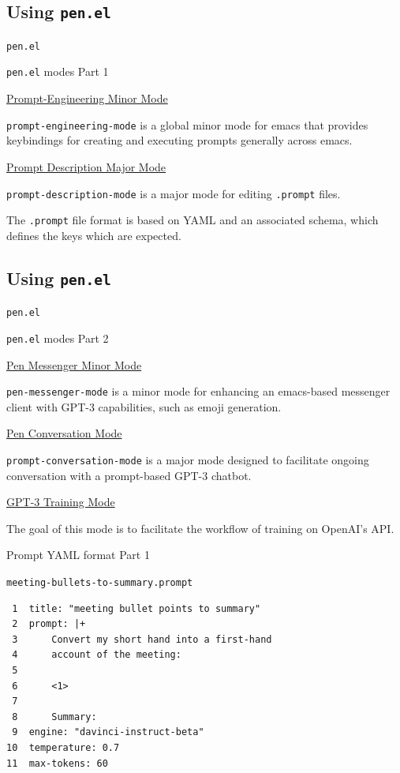 \documentclass[presentation]{beamer}
\begin{document}
\subsection{Using \texttt{pen.el}}
\label{sec:org3d01bf0}
\begin{frame}[label={sec:orga339e2e},fragile]{\texttt{pen.el}}
 \begin{block}{\texttt{pen.el} modes Part 1}
{\footnotesize
\uline{\alert{Prompt-Engineering Minor Mode}}

\texttt{prompt-engineering-mode} is a global minor
mode for emacs that provides keybindings for
creating and executing prompts generally
across emacs.

\uline{\alert{Prompt Description Major Mode}}

\texttt{prompt-description-mode} is a major mode for
editing \texttt{.prompt} files.

The \texttt{.prompt} file format is based on YAML and
an associated schema, which defines the keys
which are expected.
}
\end{block}
\end{frame}

\subsection{Using \texttt{pen.el}}
\label{sec:orgbb845b8}
\begin{frame}[label={sec:orgca1efad},fragile]{\texttt{pen.el}}
 \begin{block}{\texttt{pen.el} modes Part 2}
{\footnotesize
\uline{\alert{Pen Messenger Minor Mode}}

\texttt{pen-messenger-mode} is a minor mode for
enhancing an emacs-based messenger client with
GPT-3 capabilities, such as emoji generation.

\uline{\alert{Pen Conversation Mode}}

\texttt{prompt-conversation-mode} is a major mode designed to facilitate
ongoing conversation with a prompt-based GPT-3 chatbot.

\uline{\alert{GPT-3 Training Mode}}

The goal of this mode is to facilitate the
workflow of training on OpenAI's API.
}
\end{block}
\end{frame}

\begin{frame}[label={sec:org1b9b4a3},fragile]{Prompt YAML format Part 1}
 \begin{block}{\texttt{meeting-bullets-to-summary.prompt}}
\begin{verbatim}
 1  title: "meeting bullet points to summary"
 2  prompt: |+
 3      Convert my short hand into a first-hand
 4      account of the meeting:
 5  
 6      <1>
 7  
 8      Summary:
 9  engine: "davinci-instruct-beta"
10  temperature: 0.7
11  max-tokens: 60
\end{verbatim}
\end{block}
\end{frame}
\end{document}
